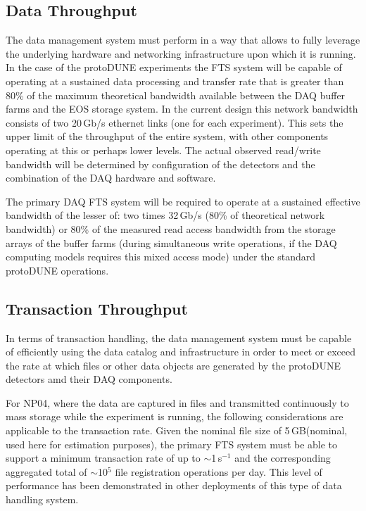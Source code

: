 \documentclass[12pt]{article}
\newcommand{\pd}{protoDUNE\xspace}
\newcommand{\filesize}{5\,GB\xspace}
\begin{document}
{\subsection{Data Throughput}

The data management system must perform in a way that allows to fully leverage the underlying hardware and networking infrastructure
upon which  it is running.  In the case of the \pd experiments the FTS system will be capable of operating at a sustained data processing and transfer
rate that is greater than 80\% of the maximum theoretical bandwidth available between the DAQ buffer farms and the EOS storage system.
In the current design this network bandwidth consists of two 20\,Gb/s ethernet links (one for each experiment).
This sets the upper limit of the throughput of the entire system, with other components operating at this or perhaps lower levels.
The actual observed read/write bandwidth will be determined by configuration of the detectors and the combination
of the DAQ hardware and software.


  The primary DAQ FTS system will be required to operate at a sustained effective bandwidth
of the lesser of: two times 32\,Gb/s (80\% of theoretical network bandwidth) or 80\% of the measured read access bandwidth from the storage arrays
of the buffer farms
(during simultaneous write operations, if the DAQ computing models requires this mixed access mode) under the standard \pd operations.

\subsection{Transaction Throughput}

In terms of transaction handling,  the data management system must be capable of efficiently using the data
catalog and infrastructure in order to meet or exceed the rate at which files or other data
objects are generated by the \pd detectors amd their DAQ components.

For NP04, where the data are captured in files and transmitted continuously to mass storage while
the experiment is running, the following considerations are applicable to the transaction rate.
Given the nominal file size of \filesize (nominal, used here for estimation purposes), 
the primary FTS system must be able to support a minimum transaction rate of up to  $\sim$1\,s$^{-1}$
and the corresponding aggregated total of $\sim$10$^5$ file registration operations per day.
This level of performance has been demonstrated in other deployments of this type of data
handling system.

}
\end{document}
